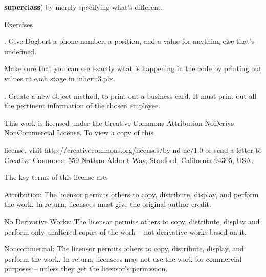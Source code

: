 \documentclass[a4paper,11pt]{book}
\begin{document}
\noindent \textbf{superclass}) by merely specifying what's different.

\noindent 

\noindent 

\noindent 

\noindent 

\noindent Exercises

\noindent 

.   Give Dogbert a phone number, a position, and a value for anything else that's undefined.

\noindent Make sure that you can see exactly what is happening in the code by printing out values at each stage in inherit3.plx.

\noindent 

.   Create a new object method, to print out a business card. It must print out all the pertinent information of the chosen employee.

\noindent  

\noindent  

\noindent  

\noindent  

\noindent 

\noindent 

\noindent 

\noindent This work is licensed under the Creative Commons Attribution-NoDerivs-NonCommercial License. To view a copy of this

\noindent license, visit http://creativecommons.org/licenses/by-nd-nc/1.0 or send a letter to Creative Commons, 559 Nathan Abbott Way, Stanford, California 94305, USA.

\noindent 

\noindent The key terms of this license are:

\noindent 

\noindent Attribution: The licensor permits others to copy, distribute, display, and perform the work. In return, licensees must give the original author credit.

\noindent 

\noindent No  Derivative  Works: The licensor permits others to copy, distribute, display and perform only unaltered copies of the work -- not derivative works based on it.

\noindent 

\noindent Noncommercial: The licensor permits others to copy, distribute, display, and perform the work. In return, licensees may not use the work for commercial purposes -- unless they get the licensor's permission.
\end{document}
